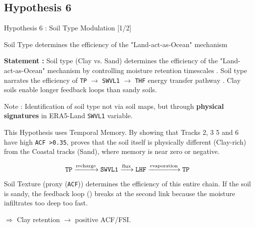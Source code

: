 \subsection{Hypothesis 6}
\begin{frame}{Hypothesis 6 : Soil Type Modulation [1/2]}
	\begin{block}{Soil Type determines the efficiency of the "Land-act-as-Ocean" mechanism}\end{block}

	\footnotesize
	\textbf{Statement :} Soil type (Clay vs. Sand) determines the efficiency of the "Land-act-as-Ocean" mechanism by controlling moisture retention timescales \cite{seneviratne2010investigating}. Soil type narrates the efficiency of \texttt{TP} $\rightarrow$ \texttt{SWVL1} $\rightarrow$ \texttt{THF} energy transfer pathway \cite{hunt2017effect}. Clay soils enable longer feedback loops than sandy soils.

	\vspace{0.1cm}
	\begin{block}{\footnotesize Note :}
		Identification of soil type not via soil maps, but through \textbf{physical signatures} in ERA5-Land \texttt{SWVL1} variable.
	\end{block}

	\vspace{0.15cm}
	\footnotesize
	This Hypothesis uses Temporal Memory. By showing that Tracks 2, 3 5 and 6 have high \texttt{ACF >0.35}, proves that the soil itself is physically different (Clay-rich) from the Coastal tracks (Sand), where memory is near zero or negative.

	\begin{equation}
		\text{\texttt{TP}} \xrightarrow{\text{recharge}} \text{\texttt{SWVL1}} \xrightarrow{\text{flux}} \text{\texttt{LHF}} \xrightarrow{\text{evaporation}} \text{\texttt{TP}}
	\end{equation}
	Soil Texture (proxy (\texttt{ACF})) determines the efficiency of this entire chain. If the soil is sandy, the feedback loop (\cite{hunt2017effect}) breaks at the second link because the moisture infiltrates too deep too fast.

	\vspace{0.15cm}
	\footnotesize
	$\Rightarrow$ Clay retention $\rightarrow$ positive ACF/FSI.


\end{frame}
